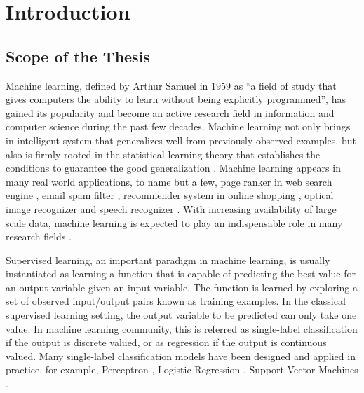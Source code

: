 




%
%
\chapter{Introduction}\label{ch_introduction}



%
%
\section{Scope of the Thesis}

Machine learning, defined by Arthur Samuel in $1959$ as ``a field of study that gives computers the ability to learn without being explicitly programmed'', has gained its popularity and become an active research field in information and computer science during the past few decades.
Machine learning not only brings in intelligent system that generalizes well from previously observed examples, but also is firmly rooted in the statistical learning theory that establishes the conditions to guarantee the good generalization \citep{Vapnik98statistical,Vapnik99an}.
Machine learning appears in many real world applications, to name but a few, page ranker in web search engine \citep{Richardson06beyond}, email spam filter \citep{Goodman06online}, recommender system in online shopping \citep{Bell07lessons}, optical image recognizer and speech recognizer \citep{Bengio09learning}.
With increasing availability of large scale data, machine learning is expected to play an indispensable role in many research fields \citep{Fan13mining}.

Supervised learning, an important paradigm in machine learning, is usually instantiated as learning a function that is capable of predicting the best value for an output variable given an input variable.
The function is learned by exploring a set of observed input/output pairs known as training examples.
In the classical supervised learning setting, the output variable to be predicted can only take one value.
In machine learning community, this is referred as single-label classification if the output is discrete valued, or as regression if the output is continuous valued.
Many single-label classification models have been designed and applied in practice, for example, Perceptron \citep{Rosenblatt58,Rosenblatt62}, Logistic Regression \citep{Chen99,Chen00,Goodman03}, Support Vector Machines \citep{Boser92,Cortes95support}.

